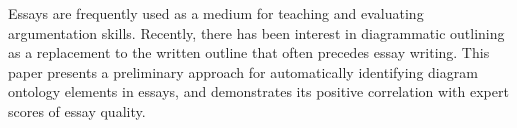 Essays are frequently used as a medium for teaching and evaluating argumentation skills.  Recently, there has been interest in diagrammatic outlining as a replacement to the written outline that often precedes essay writing.  This paper presents a preliminary approach for automatically identifying diagram ontology elements in essays, and demonstrates its positive correlation with expert scores of essay quality.
